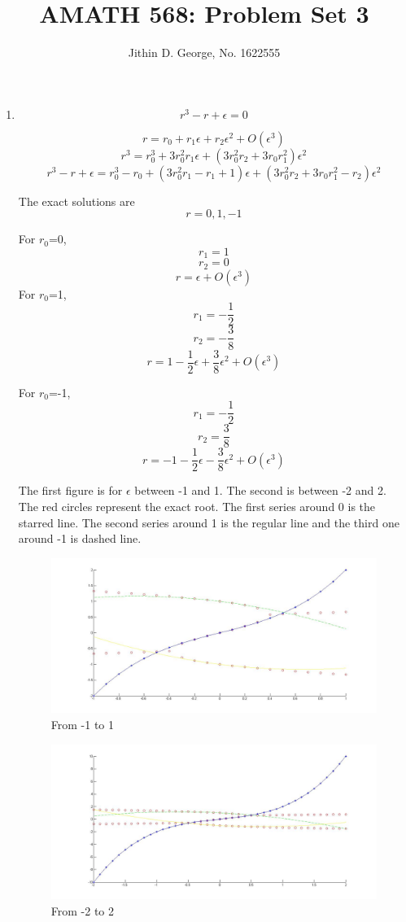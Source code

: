 \documentclass[a4paper]{article}
\title{AMATH 568: Problem Set 3}
\author{Jithin D. George, No. 1622555}
\begin{document}
\maketitle
\begin{enumerate}

	
\item 
\[   r^3-r +\epsilon=0\]

\[r= r_0+ r_1 \epsilon + r_2 \epsilon ^2 +O(\epsilon^3)\]
\[r^3= r_0^3 + 3r_0^2r_1 \epsilon + (3r_0^2r_2+3r_0r_1^2)\epsilon^2 \]
\[   r^3-r +\epsilon=r_0^3-r_0 + (3r_0^2r_1-r_1+1) \epsilon + (3r_0^2r_2+3r_0r_1^2-r_2)\epsilon^2 \]


The exact solutions are 
\[r=0, 1,-1\]

For $r_0$=0,
\[ r_1 =1\]
\[ r_2 =0\]
\[r=  \epsilon  +O(\epsilon^3)\]
For $r_0$=1,
\[ r_1 =-\frac{1}{2}\]
\[ r_2 =-\frac{3}{8}\]
\[r= 1- \frac{1}{2} \epsilon + \frac{3}{8} \epsilon ^2 +O(\epsilon^3)\]

For $r_0$=-1,
\[ r_1 =-\frac{1}{2}\]
\[ r_2 =\frac{3}{8}\]
\[r= -1- \frac{1}{2} \epsilon -\frac{3}{8} \epsilon ^2 +O(\epsilon^3)\]

The first figure is for $\epsilon$ between -1 and 1. The second is between -2 and 2. The red circles represent the exact root. The first series around 0 is the starred line. The second series around 1 is the regular line and the third one around -1 is dashed line. 
	    \begin{figure}[H]
	    	\centering
	    	\includegraphics[width=12cm]{1to1}
	    	\caption{From -1 to 1 }
	    	
	    \end{figure}

	    \begin{figure}[H]
	    	\centering
	    	\includegraphics[width=12cm]{2to2}
	    	\caption{From -2 to 2 }
	    	

\end{figure}
\end{enumerate}
\end{document}
